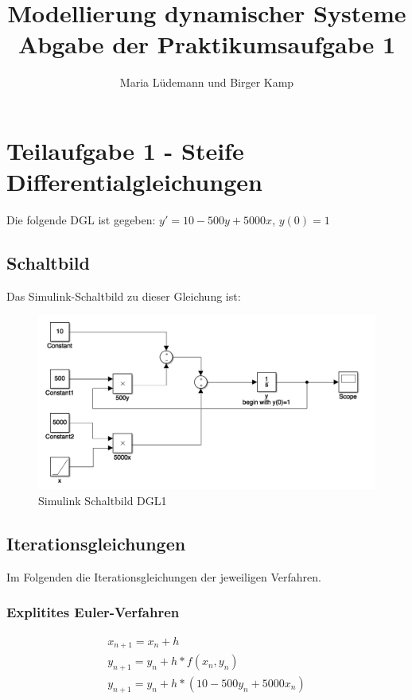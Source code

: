 \documentclass[]{scrartcl}
\title{Modellierung dynamischer Systeme  \\ Abgabe der Praktikumsaufgabe 1}
\author{Maria Lüdemann und Birger Kamp}
\begin{document}
\maketitle

\begin{abstract}

\end{abstract}

\section{Teilaufgabe 1 - Steife Differentialgleichungen}
Die folgende DGL ist gegeben:
$ y' = 10 - 500y + 5000x $,
$ y(0) = 1 $

\subsection*{Schaltbild}
Das Simulink-Schaltbild zu dieser Gleichung ist:

\begin{figure}[htbp]
\centering
\includegraphics[width=0.7\linewidth]{a1_1_Schaltbild}
\caption{Simulink Schaltbild DGL1}
\label{fig:A1_1_Schaltbild}
\end{figure}

\subsection{Iterationsgleichungen}
Im Folgenden die Iterationsgleichungen der jeweiligen Verfahren.

\subsubsection{Explitites Euler-Verfahren}
\begin{align}
x_{n+1} = x_{n}+h \\
y_{n+1} = y_{n}+h*f(x_{n},y_{n}) \\
y_{n+1} = y_{n}+h*(10-500y_{n}+5000x_{n})
\end{align}
\end{document}

